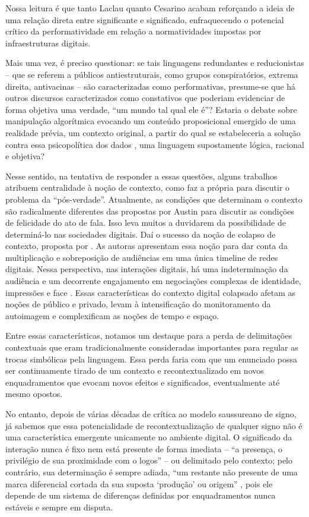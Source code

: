 \documentclass[portuguese]{textolivre}
\begin{document}
Nossa leitura é que tanto Laclau quanto Cesarino acabam reforçando a ideia de uma relação direta entre significante e significado, enfraquecendo o potencial crítico da performatividade em relação a normatividades impostas por infraestruturas digitais.

Mais uma vez, é preciso questionar: se tais linguagens redundantes e reducionistas – que se referem a públicos antiestruturais, como grupos conspiratórios, extrema direita, antivacinas – são caracterizadas como performativas, presume-se que há outros discursos caracterizados como constativos que poderiam evidenciar de forma objetiva uma verdade, “um mundo tal qual ele é”? Estaria o debate sobre manipulação algorítmica evocando um conteúdo proposicional emergido de uma realidade prévia, um contexto original, a partir do qual se estabeleceria a solução contra essa psicopolítica dos dados \cite{han2023psicopolitica}, uma linguagem supostamente lógica, racional e objetiva?

Nesse sentido, na tentativa de responder a essas questões, alguns trabalhos atribuem centralidade à noção de contexto, como faz a própria \textcite{cesarino2021b} para discutir o problema da “pós-verdade”. Atualmente, as condições que determinam o contexto são radicalmente diferentes das propostas por Austin para discutir as condições de felicidade do ato de fala. Isso leva muitos a duvidarem da possibilidade de determiná-lo nas sociedades digitais. Daí o sucesso da noção de colapso de contexto, proposta por \textcite{marwick2010tweet}. As autoras apresentam essa noção para dar conta da multiplicação e sobreposição de audiências em uma única timeline de redes digitais. Nessa perspectiva, nas interações digitais, há uma indeterminação da audiência e um decorrente engajamento em negociações complexas de identidade, impressões e face \cite[p. 123]{marwick2010tweet}. Essas características do contexto digital colapsado afetam as noções de público e privado, levam à intensificação do monitoramento da autoimagem e complexificam as noções de tempo e espaço.

Entre essas características, notamos um destaque para a perda de delimitações contextuais que eram tradicionalmente consideradas importantes para regular as trocas simbólicas pela linguagem. Essa perda faria com que um enunciado possa ser continuamente tirado de um contexto e recontextualizado em novos enquadramentos que evocam novos efeitos e significados, eventualmente até mesmo opostos.

No entanto, depois de várias décadas de crítica ao modelo saussureano de signo, já sabemos que essa potencialidade de recontextualização de qualquer signo não é uma característica emergente unicamente no ambiente digital. O significado da interação nunca é fixo nem está presente de forma imediata – “a presença, o privilégio de sua proximidade com o logos” \cite[p. 31]{derrida1967grammatologie} – ou delimitado pelo contexto; pelo contrário, sua determinação é sempre adiada, “um restante não presente de uma marca diferencial cortada da sua suposta ‘produção’ ou origem” \cite[p. 32]{derrida1990limited}, pois ele depende de um sistema de diferenças definidas por enquadramentos nunca estáveis e sempre em disputa.
\end{document}
